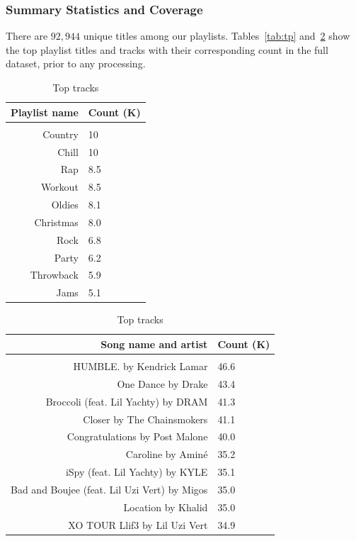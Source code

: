 \documentclass{article} %
\begin{document}
\subsubsection{Summary Statistics and Coverage}
\label{sec:stats}

There are $92,944$ unique titles among our playlists. Tables~\ref{tab:tp} and~\ref{tab:tt} show the top playlist titles and tracks with their corresponding count in the full dataset, prior to any processing.

\begin{table}[ht]
\begin{minipage}[b]{0.4\linewidth}
\centering
    \begin{tabular}{rl}
    \multicolumn{1}{r}{\bf Playlist name} &  \multicolumn{1}{l}{\bf Count (K)}  \\
    \hline \\
    Country & 10  \\
    Chill & 10 \\
    Rap & 8.5\\
    Workout & 8.5\\
    Oldies & 8.1\\
    Christmas & 8.0 \\
    Rock & 6.8\\
    Party & 6.2\\
    Throwback & 5.9\\
    Jams & 5.1\\ 
    \end{tabular}
    \caption{Top playlist names}
    \label{tab:tp}
\end{minipage}\hfill
\begin{minipage}[b]{0.6\linewidth}
\centering
    \begin{tabular}{rl}
    \multicolumn{1}{r}{\bf Song name and artist}& \multicolumn{1}{l}{\bf Count (K)}\\
    \hline \\
    HUMBLE. by Kendrick Lamar & 46.6 \\
    One Dance by Drake & 43.4 \\
    Broccoli (feat. Lil Yachty) by DRAM & 41.3 \\
    Closer by The Chainsmokers & 41.1\\
    Congratulations by Post Malone & 40.0 \\
    Caroline by Aminé & 35.2\\
    iSpy (feat. Lil Yachty) by KYLE & 35.1\\
    Bad and Boujee (feat. Lil Uzi Vert) by Migos & 35.0 \\
    Location by Khalid& 35.0 \\
    XO TOUR Llif3 by Lil Uzi Vert & 34.9 
    \end{tabular}
    \caption{Top tracks}
    \label{tab:tt}
\end{minipage}
\end{table}
\end{document}
